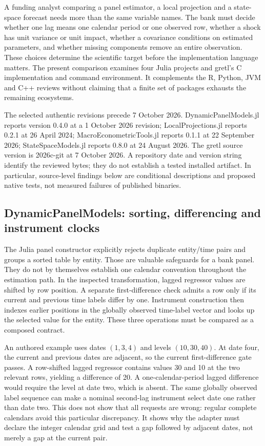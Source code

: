 A funding analyst comparing a panel estimator, a local projection and a state-space forecast needs more than the same variable names. The bank must decide whether one lag means one calendar period or one observed row, whether a shock has unit variance or unit impact, whether a covariance conditions on estimated parameters, and whether missing components remove an entire observation. These choices determine the scientific target before the implementation language matters. The present comparison examines four Julia projects and gretl's C implementation and command environment. It complements the R, Python, JVM and C++ reviews without claiming that a finite set of packages exhausts the remaining ecosystems.

The selected authentic revisions precede 7 October 2026. DynamicPanelModels.jl reports version 0.4.0 at a 1 October 2026 revision; LocalProjections.jl reports 0.2.1 at 26 April 2024; MacroEconometricTools.jl reports 0.1.1 at 22 September 2026; StateSpaceModels.jl reports 0.8.0 at 24 August 2026. The gretl source version is 2026c-git at 7 October 2026. A repository date and version string identify the reviewed bytes; they do not establish a tested installed artifact. In particular, source-level findings below are conditional descriptions and proposed native tests, not measured failures of published binaries.~\citep{exec25_odyn_dpm,exec25_odyn_lp,exec25_odyn_macro,exec25_odyn_ssm,exec25_odyn_gretl}

\subsection{DynamicPanelModels: sorting, differencing and instrument clocks}

The Julia panel constructor explicitly rejects duplicate entity/time pairs and groups a sorted table by entity. Those are valuable safeguards for a bank panel. They do not by themselves establish one calendar convention throughout the estimation path. In the inspected transformation, lagged regressor values are shifted by row position. A separate first-difference check admits a row only if its current and previous time labels differ by one. Instrument construction then indexes earlier positions in the globally observed time-label vector and looks up the selected value for the entity. These three operations must be compared as a composed contract.~\citep{exec25_odyn_dpm}

An authored example uses dates $(1,3,4)$ and levels $(10,30,40)$. At date four, the current and previous dates are adjacent, so the current first-difference gate passes. A row-shifted lagged regressor contains values 30 and 10 at the two relevant rows, yielding a difference of 20. A one-calendar-period lagged difference would require the level at date two, which is absent. The same globally observed label sequence can make a nominal second-lag instrument select date one rather than date two. This does not show that all requests are wrong: regular complete calendars avoid this particular discrepancy. It shows why the adapter must declare the integer calendar grid and test a gap followed by adjacent dates, not merely a gap at the current pair.~\citep{exec25_odyn_dpm,exec25_odyn_choice}

